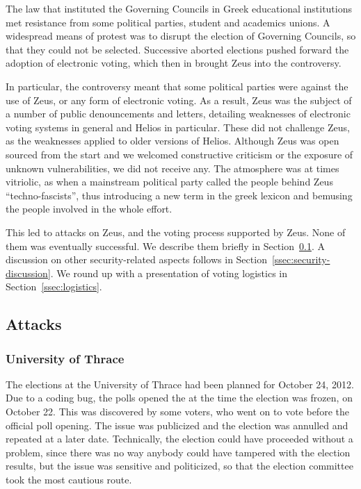 \documentclass[letterpaper,10pt]{article}
\begin{document}
The law that instituted the Governing Councils in Greek educational
institutions met resistance from some political parties, student and
academics unions. A widespread means of protest was to disrupt the
election of Governing Councils, so that they could not be selected.
Successive aborted elections pushed forward the adoption of electronic
voting, which then in brought Zeus into the controversy. 

In particular, the controversy meant that some political parties were
against the use of Zeus, or any form of electronic voting. As a
result, Zeus was the subject of a number of public denouncements and
letters, detailing weaknesses of electronic voting systems in general
and Helios in particular. These did not challenge Zeus, as the
weaknesses applied to older versions of Helios. Although Zeus was open
sourced from the start and we welcomed constructive criticism or the
exposure of unknown vulnerabilities, we did not receive any. The
atmosphere was at times vitriolic, as when a mainstream political
party called the people behind Zeus ``techno-fascists'', thus
introducing a new term in the greek lexicon and bemusing the people
involved in the whole effort.

This led to attacks on Zeus, and the voting process supported by Zeus.
None of them was eventually successful. We describe them briefly in
Section~\ref{ssec:attacks}. A discussion on other security-related
aspects follows in Section~\ref{ssec:security-discussion}. We round up
with a presentation of voting logistics in
Section~\ref{ssec:logistics}.

\subsection{Attacks}
\label{ssec:attacks}

\subsubsection{University of Thrace}

The elections at the University of Thrace had been planned for October
24, 2012. Due to a coding bug, the polls opened the at the time the
election was frozen, on October 22. This was discovered by some
voters, who went on to vote before the official poll opening. The
issue was publicized and the election was annulled and repeated at a
later date. Technically, the election could have proceeded without a
problem, since there was no way anybody could have tampered with the
election results, but the issue was sensitive and politicized, so that
the election committee took the most cautious route.
\end{document}

